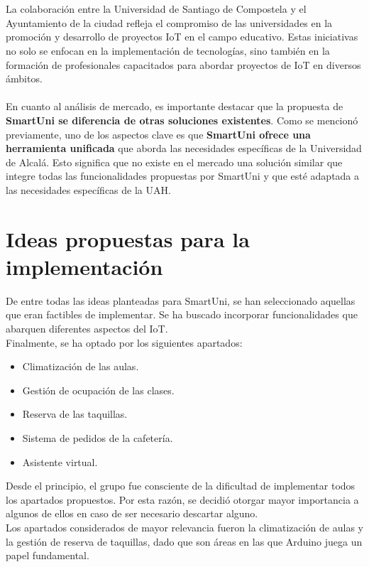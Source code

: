 \documentclass[12pt]{report}
\begin{document}
\\\\
La colaboración entre la Universidad de Santiago de Compostela y el Ayuntamiento de la ciudad refleja el compromiso de las universidades en la promoción y desarrollo de proyectos IoT en el campo educativo. Estas iniciativas no solo se enfocan en la implementación de tecnologías, sino también en la formación de profesionales capacitados para abordar proyectos de IoT en diversos ámbitos.
\\\\
En cuanto al análisis de mercado, es importante destacar que la propuesta de \textbf{SmartUni se diferencia de otras soluciones existentes}. Como se mencionó previamente, uno de los aspectos clave es que \textbf{SmartUni ofrece una herramienta unificada} que aborda las necesidades específicas de la Universidad de Alcalá. Esto significa que no existe en el mercado una solución similar que integre todas las funcionalidades propuestas por SmartUni y que esté adaptada a las necesidades específicas de la UAH.

\newpage

\section{Ideas propuestas para la implementación}
De entre todas las ideas planteadas para SmartUni, se han seleccionado aquellas que eran factibles de implementar. Se ha buscado incorporar funcionalidades que abarquen diferentes aspectos del IoT.\\

Finalmente, se ha optado por los siguientes apartados:

\begin{itemize}
\item Climatización de las aulas.
\item Gestión de ocupación de las clases.
\item Reserva de las taquillas.
\item Sistema de pedidos de la cafetería.
\item Asistente virtual.
\end{itemize}

Desde el principio, el grupo fue consciente de la dificultad de implementar todos los apartados propuestos. Por esta razón, se decidió otorgar mayor importancia a algunos de ellos en caso de ser necesario descartar alguno.\\

Los apartados considerados de mayor relevancia fueron la climatización de aulas y la gestión de reserva de taquillas, dado que son áreas en las que Arduino juega un papel fundamental.\\
\end{document}
